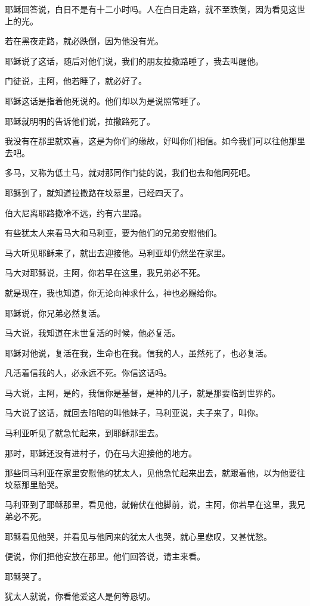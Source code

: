 \documentclass[12pt,oneside]{book}
\begin{document}
耶稣回答说，白日不是有十二小时吗。人在白日走路，就不至跌倒，因为看见这世上的光。

若在黑夜走路，就必跌倒，因为他没有光。

耶稣说了这话，随后对他们说，我们的朋友拉撒路睡了，我去叫醒他。

门徒说，主阿，他若睡了，就必好了。

耶稣这话是指着他死说的。他们却以为是说照常睡了。

耶稣就明明的告诉他们说，拉撒路死了。

我没有在那里就欢喜，这是为你们的缘故，好叫你们相信。如今我们可以往他那里去吧。

多马，又称为低土马，就对那同作门徒的说，我们也去和他同死吧。

耶稣到了，就知道拉撒路在坟墓里，已经四天了。

伯大尼离耶路撒冷不远，约有六里路。

有些犹太人来看马大和马利亚，要为他们的兄弟安慰他们。

马大听见耶稣来了，就出去迎接他。马利亚却仍然坐在家里。

马大对耶稣说，主阿，你若早在这里，我兄弟必不死。

就是现在，我也知道，你无论向神求什么，神也必赐给你。

耶稣说，你兄弟必然复活。

马大说，我知道在末世复活的时候，他必复活。

耶稣对他说，复活在我，生命也在我。信我的人，虽然死了，也必复活。

凡活着信我的人，必永远不死。你信这话吗。

马大说，主阿，是的，我信你是基督，是神的儿子，就是那要临到世界的。

马大说了这话，就回去暗暗的叫他妹子，马利亚说，夫子来了，叫你。

马利亚听见了就急忙起来，到耶稣那里去。

那时，耶稣还没有进村子，仍在马大迎接他的地方。

那些同马利亚在家里安慰他的犹太人，见他急忙起来出去，就跟着他，以为他要往坟墓那里胎哭。

马利亚到了耶稣那里，看见他，就俯伏在他脚前，说，主阿，你若早在这里，我兄弟必不死。

耶稣看见他哭，并看见与他同来的犹太人也哭，就心里悲叹，又甚忧愁。

便说，你们把他安放在那里。他们回答说，请主来看。

耶稣哭了。

犹太人就说，你看他爱这人是何等恳切。
\end{document}
